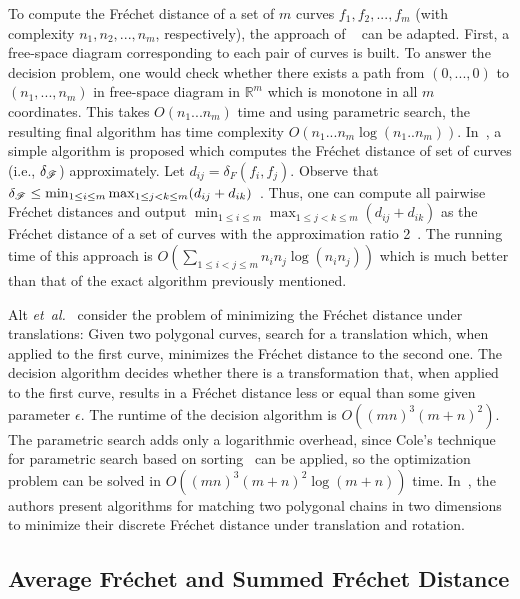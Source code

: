 \documentclass[12pt]{dalthesis}
\newcommand{\IR}{\ensuremath{\mathbb{R}}}
\newcommand{\etal}{{\em et~al.\/}}
\newcommand{\Frechet}{Fr\'echet }
\newcommand{\distF}{\delta_F}
\begin{document}
To compute the \Frechet distance of a set of $m$ 
curves $f_1,f_2,...,f_m$ (with complexity $n_1,n_2,...,n_m$, respectively), 
the approach of ~\cite{AltG95} can be adapted. 
First, a free-space diagram corresponding to each pair of curves is built. 
To answer the decision problem, one would
 check whether 
there exists a path from  $(0,...,0)$ to $(n_1,...,n_m)$ in free-space
diagram in $\IR^m$ which is monotone in all $m$ coordinates.
This  takes $O(n_1 ... n_m)$ time and  using parametric search, the resulting final algorithm
has time complexity $O(n_1...n_m\log(n_1..n_m))$.
In~\cite{SetofCurves}, a simple algorithm 
is proposed which computes 
the \Frechet distance of set of curves (i.e., $\delta_{{\mathscr F}}$) approximately. 
Let $d_{ij} = \distF(f_i,f_j)$. Observe that 
$\delta_{{\mathscr F}} \le \min_{1 \le i \le m} \max_{1\le j <k \le m} (d_{ij} + d_{ik})$~\cite{SetofCurves}.
Thus, one can compute all pairwise \Frechet distances and 
output  $\min_{1 \le i \le m} \max_{1\le j <k \le m} (d_{ij} + d_{ik})$ as
the \Frechet distance of a set of curves with the approximation ratio 2~\cite{SetofCurves}. The running time of this approach is $O(\sum_{1\le i <j \le m} n_i n_j \log (n_in_j))$ which is much better than that of the exact algorithm previously mentioned.



Alt \etal~\cite{AltTranslation} consider the problem of 
minimizing the \Frechet distance under translations:
Given two polygonal curves, search for a translation which, when
applied to the first curve, minimizes the \Frechet distance to the second one.
The decision algorithm decides whether there is a transformation
that, when applied to the first curve, results in a \Frechet 
distance less or equal than some given parameter $\epsilon$.
The runtime of the decision algorithm is $O( (mn)^3(m+n)^2)$. 
The parametric search adds only a logarithmic overhead,
since Cole's technique for parametric search based on sorting~\cite{Cole87} can be applied, so
the optimization problem can be solved in $O((mn)^3(m + n)^2 \log(m + n))$ time. 
In~\cite{JiangXZ08}, the authors present  algorithms for matching two polygonal chains 
in two dimensions to minimize their discrete \Frechet distance under 
translation and rotation.








\subsection{Average \Frechet and Summed \Frechet Distance }
\end{document}
